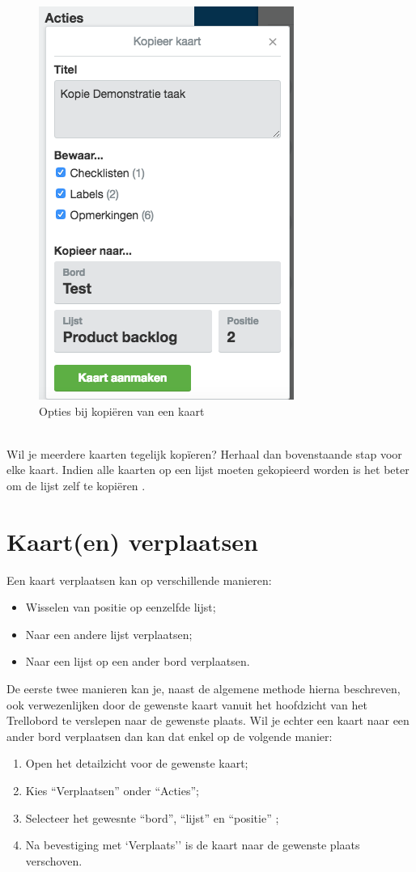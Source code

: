 \begin{figure}[H]
	\centering
	\includegraphics[scale=0.45]{./afbeeldingen/kopieer_kaart.png}
	\caption{Opties bij kopi\"eren van een kaart}
	\label{fig:kopieer_kaart}	
\end{figure} 
\noindent
\\Wil je meerdere kaarten tegelijk kop\"ieren? Herhaal dan bovenstaande stap voor elke kaart. Indien alle kaarten op een lijst moeten gekopieerd worden is het beter om de lijst zelf te kopi\"eren . 

\section{Kaart(en) verplaatsen}

Een kaart verplaatsen kan op verschillende manieren:
\begin{itemize}
	\item Wisselen van positie op eenzelfde lijst;
	\item Naar een andere lijst verplaatsen;
	\item Naar een lijst op een ander bord verplaatsen.
\end{itemize} 
\noindent
De eerste twee manieren kan je, naast de algemene methode hierna beschreven, ook verwezenlijken door de gewenste kaart vanuit het hoofdzicht van het Trellobord te verslepen naar de gewenste plaats. Wil je echter een kaart naar een ander bord verplaatsen dan kan dat enkel op de volgende manier:
\begin{enumerate}[nolistsep]
	\item Open het detailzicht voor de gewenste kaart;
	\item Kies ``Verplaatsen'' onder ``Acties'';
	\item Selecteer het gewesnte ``bord'', ``lijst'' en ``positie'' ;
	\item Na bevestiging met `Verplaats'' is de kaart naar de gewenste plaats verschoven.
\end{enumerate}

